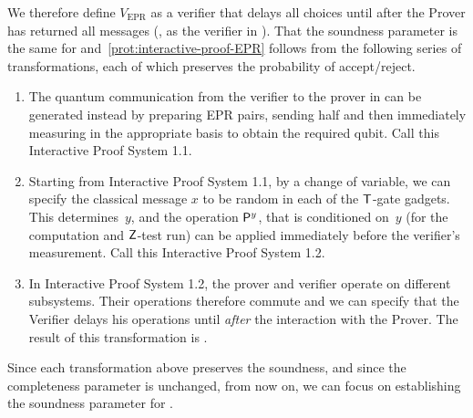 \documentclass{toc}
\newcommand{\pgate}{{\sf P}}
\newcommand{\tgate}{{\sf T}}
\newcommand{\zgate}{{\sf Z}}
\begin{document}
We therefore define $V_{\text{EPR}}$ as a verifier that delays all choices until after the Prover has returned all messages (\ie, as the verifier in ).
That the soundness parameter is the same for  and~\ref{prot:interactive-proof-EPR} follows from the following series of transformations, each of which preserves the probability of accept/reject.
%
\begin{enumerate}
\item The  quantum communication from the verifier to the prover in  can be generated instead by preparing EPR pairs, sending half and then immediately measuring in the appropriate basis to obtain the required qubit. Call this Interactive Proof System 1.1.
%
\item  Starting from Interactive Proof System 1.1, by a change of variable, we can specify the classical message $x$ to be random in each of the $\tgate$-gate gadgets. This determines~$y$, and the operation
 $\pgate^y$, that is conditioned on~$y$ (for the computation and $\zgate$-test run) can be applied immediately before the verifier's measurement. Call this Interactive Proof System 1.2.
\item In Interactive Proof System 1.2, the prover and verifier operate on different subsystems. 
%
%
Their operations therefore commute and we can specify that the Verifier delays his operations until \emph{after} the interaction with the Prover. The result of this transformation is .
\end{enumerate}

Since each transformation above preserves the soundness, and since the completeness parameter is unchanged,
from now on, we can focus on establishing the soundness parameter for .

%



%
\end{document}
